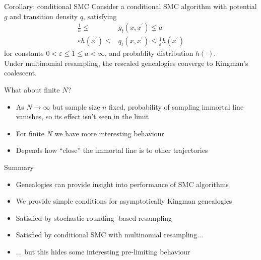 \documentclass[aspectratio=169]{beamer}
\theoremstyle{definition}
\begin{document}
\begin{frame}{Corollary: conditional SMC}
Consider a conditional SMC algorithm with potential $g$ and transition density $q$, satisfying
\begin{align}
\frac{1}{a} \leq &g_t(x, x^\prime) \leq a \\
\varepsilon h(x^\prime) \leq &q_t(x, x^\prime) \leq \frac{1}{\varepsilon} h(x^\prime) 
\end{align}
for constants $0<\varepsilon\leq 1\leq a<\infty$, and probablity distribution $h(\cdot)$.\\[10pt]

Under multinomial resampling, the rescaled genealogies converge to Kingman's coalescent.
\end{frame}

\begin{frame}{What about finite $N$?}
\begin{itemize}
\item As $N\to\infty$ but sample size $n$ fixed, probability of sampling immortal line vanishes, so its effect isn't seen in the limit
\item For finite $N$ we have more interesting behaviour
\item Depends how ``close'' the immortal line is to other trajectories
\end{itemize}
\end{frame}

\begin{frame}{Summary}
\begin{itemize}
\item Genealogies can provide insight into performance of SMC algorithms
\item We provide simple conditions for asymptotically Kingman genealogies
\item Satisfied by stochastic rounding -based resampling
\item Satisfied by conditional SMC with multinomial resampling...
\item ... but this hides some interesting pre-limiting behaviour
\end{itemize}
\end{frame}
\end{document}
